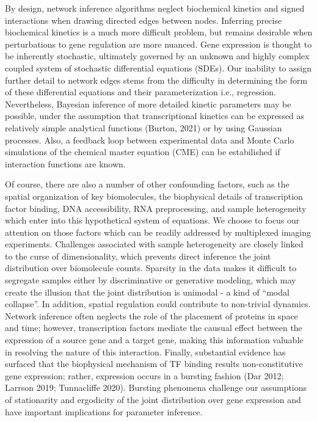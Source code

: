 \documentclass{article}
\begin{document}
By design, network inference algorithms neglect biochemical kinetics and signed interactions when drawing directed edges between nodes. Inferring precise biochemical kinetics is a much more difficult problem, but remains desirable when perturbations to gene regulation are more nuanced. Gene expression is thought to be inherently stochastic, ultimately governed by an unknown and highly complex coupled system of stochastic differential equations (SDEs). Our inability to assign further detail to network edges stems from the difficulty in determining the form of these differential equations and their parameterization i.e., regression. Nevertheless, Bayesian inference of more detailed kinetic parameters may be possible, under the assumption that transcriptional kinetics can be expressed as relatively simple analytical functions (Burton, 2021) or by using Gaussian processes. Also, a feedback loop between experimental data and Monte Carlo simulations of the chemical master equation (CME) can be estabilished if interaction functions are known.

Of course, there are also a number of other confounding factors, such as the spatial organization of key biomolecules, the biophysical details of transcription factor binding, DNA accessibility, RNA preprocessing, and sample heterogeneity which enter into this hypothetical system of equations. We choose to focus our attention on those factors which can be readily addressed by multiplexed imaging experiments. Challenges associated with sample heterogeneity are closely linked to the curse of dimensionality, which prevents direct inference the joint distribution over biomolecule counts. Sparsity in the data makes it difficult to segregate samples either by discriminative or generative modeling, which may create the illusion that the joint distribution is unimodal - a kind of ``modal collapse''. In addition, spatial regulation could contribute to non-trivial dynamics. Network inference often neglects the role of the placement of proteins in space and time; however, transcription factors mediate the causual effect between the expression of a source gene and a target gene, making this information valuable in resolving the nature of this interaction. Finally, substantial evidence has surfaced that the biophysical mechanism of TF binding results non-constitutive gene expression; rather, expression occurs in a bursting fashion (Dar 2012; Larrson 2019; Tunnacliffe 2020). Bursting phenomena challenge our assumptions of stationarity and ergodicity of the joint distribution over gene expression and have important implications for parameter inference.
\end{document}

